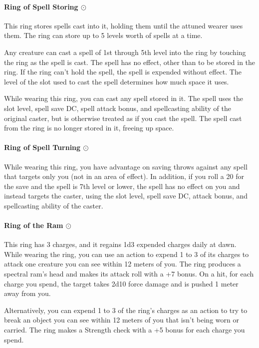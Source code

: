     \paragraph{Ring of Spell Storing $\odot$}
        This ring stores spells cast into it, holding them until the attuned wearer uses them.
        The ring can store up to 5 levels worth of spells at a time.

        Any creature can cast a spell of 1st through 5th level into the ring by touching the ring as the spell is cast.
        The spell has no effect, other than to be stored in the ring.
        If the ring can't hold the spell, the spell is expended without effect.
        The level of the slot used to cast the spell determines how much space it uses.

        While wearing this ring, you can cast any spell stored in it.
        The spell uses the slot level, spell save DC, spell attack bonus, and spellcasting ability of the original caster, but is otherwise treated as if you cast the spell.
        The spell cast from the ring is no longer stored in it, freeing up space.
    \paragraph{Ring of Spell Turning $\odot$}
        While wearing this ring, you have advantage on saving throws against any spell that targets only you (not in an area of effect).
        In addition, if you roll a 20 for the save and the spell is 7th level or lower, the spell has no effect on you and instead targets the caster, using the slot level, spell save DC, attack bonus, and spellcasting ability of the caster.
    \paragraph{Ring of the Ram $\odot$}
        This ring has 3 charges, and it regains 1d3 expended charges daily at dawn.
        While wearing the ring, you can use an action to expend 1 to 3 of its charges to attack one creature you can see within 12 meters of you.
        The ring produces a spectral ram's head and makes its attack roll with a +7 bonus.
        On a hit, for each charge you spend, the target takes 2d10 force damage and is pushed 1 meter away from you.

        Alternatively, you can expend 1 to 3 of the ring's charges as an action to try to break an object you can see within 12 meters of you that isn't being worn or carried.
        The ring makes a Strength check with a +5 bonus for each charge you spend.
